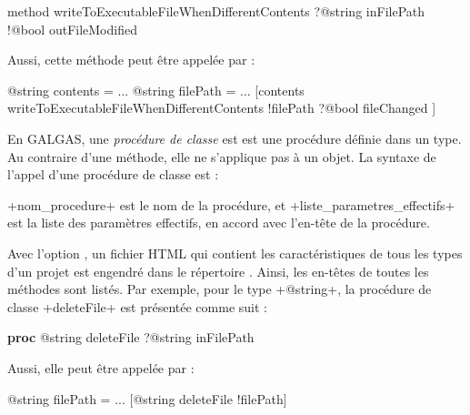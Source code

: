 \begin{galgas}
method writeToExecutableFileWhenDifferentContents
  ?@string inFilePath
  !@bool outFileModified
\end{galgas}


Aussi, cette méthode peut être appelée par :
\begin{galgas}
@string contents = ...
@string filePath = ...
[contents writeToExecutableFileWhenDifferentContents
  !filePath
  ?@bool fileChanged
]
\end{galgas}
















En GALGAS, une \emph{procédure de classe} est est une procédure définie dans un type. Au contraire d'une méthode, elle ne s'applique pas à un objet. La syntaxe de l'appel d'une procédure de classe est :
\begin{galgas}
\end{galgas}

\ggs+nom_procedure+ est le nom de la procédure, et \ggs+liste_parametres_effectifs+ est la liste des paramètres effectifs, en accord avec l'en-tête de la procédure.

Avec l'option , un fichier HTML qui contient les caractéristiques de tous les types d'un projet est engendré dans le répertoire . Ainsi, les en-têtes de toutes les méthodes sont listés. Par exemple, pour le type \ggs+@string+, la procédure de classe \ggs+deleteFile+ est présentée comme suit :

{\noindent\ttfamily
\textbf{proc} @string deleteFile ?@string inFilePath\\
}

Aussi, elle peut être appelée par :
\begin{galgas}
@string filePath = ...
[@string deleteFile !filePath]
\end{galgas}











